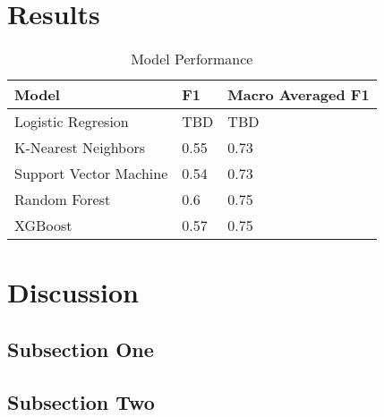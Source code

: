 \documentclass[twoside,twocolumn]{article}
\begin{document}
\section{Results}
\begin{table}
  \centering
  \caption{Model Performance}
  \begin{tabular}{lll}
  \toprule
                   Model &    F1 & Macro Averaged F1 \\
  \midrule
      Logistic Regresion &   TBD &               TBD \\
     K-Nearest Neighbors &  0.55 &              0.73 \\
  Support Vector Machine &  0.54 &              0.73 \\
           Random Forest &   0.6 &              0.75 \\
                 XGBoost &  0.57 &              0.75 \\
  \bottomrule
  \end{tabular}
  \label{table:modelperf}
  \end{table}
  
  
    





\section{Discussion}

\subsection{Subsection One}


\subsection{Subsection Two}




 

\end{document}
